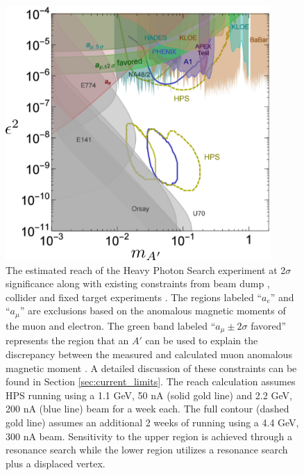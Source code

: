 \begin{figure}[h!t]
    \centering
    \includegraphics[width=0.90\textwidth]{images/ap_current_constraints.png}
    \caption{The estimated reach of the Heavy Photon Search experiment at 
             2$\sigma$ significance along with existing constraints from 
             beam dump  
             \cite{Bjorken:1988as, riordan1987, bross1991, konaka1986,
                   davier1989, Bjorken:2009mm, andreas2012, Blumlein:1990ay,
                   Blumlein:1991xh},  
             collider 
             \cite{Reece:2009un, Aubert:2009cp, Babusci:2012cr, Archilli:2011zc} 
             and fixed target experiments 
             \cite{Abrahamyan:2011gv, Merkel:2014avp, Agakishiev:2013fwl,
                   Batley:2015lha}.
             The regions labeled ``$a_e$'' and ``$a_\mu$'' are exclusions based
             on the anomalous magnetic moments of the muon and electron.
             The green band labeled ``$a_{\mu} \pm 2\sigma$ favored'' represents
             the region that an $A'$ can be used to explain the discrepancy 
             between the measured and calculated muon anomalous magnetic moment
             \cite{Pospelov:2008zw, Bennett:2006fi}.
             A detailed discussion of these constraints can be found in Section 
             \ref{sec:current_limits}.
             The reach calculation assumes HPS running using a 1.1 GeV, 50 nA 
             (solid gold line) and 2.2 GeV, 200 nA (blue line) beam for a week each.  The
             full contour (dashed gold line) assumes an additional 2 weeks of running 
             using a 4.4 GeV, 300 nA beam.
             Sensitivity to the upper region is achieved through a resonance search while
            the lower region utilizes a resonance search plus a displaced vertex.
    }
    \label{fig:ap_limits}
\end{figure}

